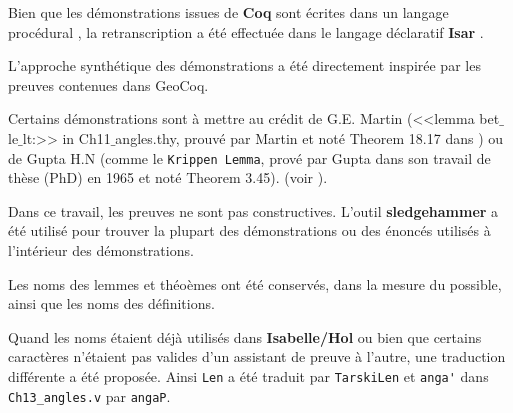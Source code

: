\documentclass[8pt,a4paper]{article}
\theoremstyle{plain}
\begin{document}

Bien que les démonstrations issues de \textbf{Coq} sont écrites dans un langage procédural
\cite{wiedijk2012synthesis},
la retranscription a été effectuée dans le langage déclaratif \textbf{Isar}
\cite{nipkow2002structured}.

L'approche synthétique des démonstrations a été directement inspirée par les preuves contenues dans GeoCoq.


Certains démonstrations sont à mettre au crédit de G.E. Martin (<<lemma bet$\_$le$\_$lt:>> in Ch11$\_$angles.thy, prouvé par Martin et noté Theorem 18.17 dans 
\cite{martin2012foundations}) ou de Gupta H.N (comme le \verb+Krippen Lemma+, prové par Gupta dans son travail de thèse (PhD) en 1965 et noté Theorem 3.45).
(voir \cite{gries:hal-01228612}).


Dans ce travail, les preuves ne sont pas constructives.
L'outil \textbf{sledgehammer} a été utilisé pour trouver la plupart des démonstrations ou des énoncés utilisés à l'intérieur des démonstrations.


Les noms des lemmes et théoèmes ont été conservés, dans la mesure du possible, ainsi que les noms des définitions.


Quand les noms étaient déjà utilisés dans \textbf{Isabelle/Hol} ou bien que certains caractères n'étaient pas valides d'un assistant de preuve à l'autre,
une traduction différente a été proposée.
Ainsi \verb+Len+ a été traduit par \verb+TarskiLen+ et \verb+anga'+ dans \verb+Ch13_angles.v+ par \verb+angaP+.
\end{document}
